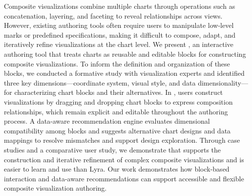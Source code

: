 Composite visualizations combine multiple charts through operations such as
concatenation, layering, and faceting to reveal relationships across views.
However, existing authoring tools often require users to manipulate low-level
marks or predefined specifications, making it difficult to compose, adapt, and
iteratively refine visualizations at the chart level. We present {\system}, an
interactive authoring tool that treats charts as reusable and editable blocks
for constructing composite visualizations. To inform the definition and
organization of these blocks, we conducted a formative study with visualization
experts and identified three key dimensions---coordinate system, visual style,
and data dimensionality---for characterizing chart blocks and their
alternatives. In {\system}, users construct visualizations by dragging and
dropping chart blocks to express composition relationships, which remain
explicit and editable throughout the authoring process. A data-aware
recommendation engine evaluates dimensional compatibility among blocks and
suggests alternative chart designs and data mappings to resolve mismatches and
support design exploration. Through case studies and a comparative user study,
we demonstrate that {\system} supports the construction and iterative
refinement of complex composite visualizations and is easier to learn and use
than Lyra. Our work demonstrates how block-based interaction and data-aware
recommendations can support accessible and flexible composite visualization
authoring.